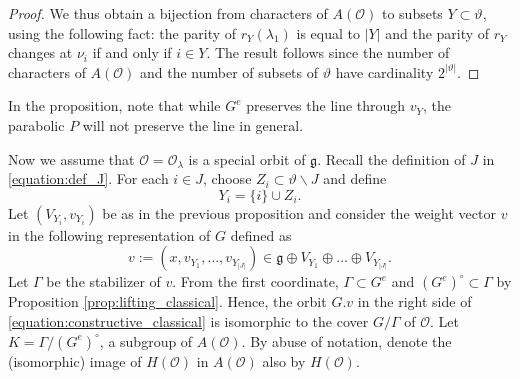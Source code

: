 \documentclass{amsart}
\theoremstyle{definition}
\newcommand{\g}{\mathfrak{g}}
\newcommand{\0}{\mathcal{O}}
\begin{document}
\begin{proof}



We thus obtain a bijection from characters of $A(\0)$ 
to subsets $Y \subset \vartheta$, using 
the following fact: 
the parity of $r_Y(\lambda_1)$ is equal to $|Y|$ and the parity of $r_Y$
changes at $\nu_i$ if and only if $i \in Y$.  The result follows since 
the number of characters of $A(\0)$ and the number of subsets of $\vartheta$ have cardinality $2^{|\vartheta|}$.
\end{proof}

In the proposition, note that while $G^e$ preserves the line through $v_Y$, the parabolic $P$ will not preserve the line in general.

Now we assume that $\0=\0_\lambda$ is a special orbit of $\g$.
Recall the definition of $J$ in \eqref{equation:def_J}.
For each $i\in J$, choose $Z_i \subset \vartheta \backslash J$ 
and define
\begin{equation}\label{equation:Y_i}
Y_i = \{i\} \cup Z_i.  
\end{equation}
Let $(V_{Y_i}, v_{Y_i})$ be as in the previous proposition and consider the weight vector $v$ in the following representation of $G$ defined as
\begin{equation}\label{equation:constructive_classical}
v:=(x, v_{Y_1}, \dots, v_{Y_{|J|}}) \in \g \oplus V_{Y_1} \oplus \dots \oplus V_{Y_{|J|}}.
\end{equation}
Let $\Gamma$ be the stabilizer of $v$.  From the first coordinate, $\Gamma \subset G^e$ and  $(G^e)^\circ \subset \Gamma$ by Proposition \ref{prop:lifting_classical}.
Hence, the orbit $G.v$ in the right side of \eqref{equation:constructive_classical}
is isomorphic to the cover $G/\Gamma$ of $\0$.  
Let $K = \Gamma/(G^e)^\circ$, a subgroup of $A(\0)$.
By abuse of notation, denote the (isomorphic) image of $H(\0)$ in $A(\0)$ also by $H(\0)$.
\end{document}
